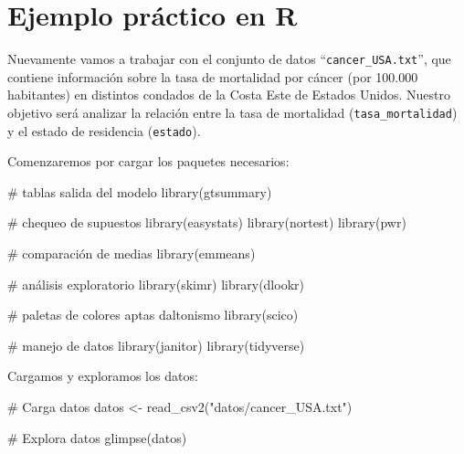 \documentclass[
  spanish,
  a4paper,
]{scrbook}
\newenvironment{Shaded}{\begin{snugshade}}{\end{snugshade}}
\newcommand{\CommentTok}[1]{\textcolor[rgb]{0.37,0.37,0.37}{#1}}
\newcommand{\FunctionTok}[1]{\textcolor[rgb]{0.28,0.35,0.67}{#1}}
\newcommand{\NormalTok}[1]{\textcolor[rgb]{0.00,0.23,0.31}{#1}}
\newcommand{\OtherTok}[1]{\textcolor[rgb]{0.00,0.23,0.31}{#1}}
\newcommand{\StringTok}[1]{\textcolor[rgb]{0.13,0.47,0.30}{#1}}
\begin{document}
\section{Ejemplo práctico en R}\label{ejemplo-pruxe1ctico-en-r-6}

Nuevamente vamos a trabajar con el conjunto de datos
``\texttt{cancer\_USA.txt}'', que contiene información sobre la tasa de
mortalidad por cáncer (por 100.000 habitantes) en distintos condados de
la Costa Este de Estados Unidos. Nuestro objetivo será analizar la
relación entre la tasa de mortalidad (\texttt{tasa\_mortalidad}) y el
estado de residencia (\texttt{estado}).

Comenzaremos por cargar los paquetes necesarios:

\begin{Shaded}
\begin{Highlighting}[]
\CommentTok{\# tablas salida del modelo}
\FunctionTok{library}\NormalTok{(gtsummary)}

\CommentTok{\# chequeo de supuestos}
\FunctionTok{library}\NormalTok{(easystats)}
\FunctionTok{library}\NormalTok{(nortest)}
\FunctionTok{library}\NormalTok{(pwr)}

\CommentTok{\# comparación de medias}
\FunctionTok{library}\NormalTok{(emmeans)}

\CommentTok{\# análisis exploratorio}
\FunctionTok{library}\NormalTok{(skimr)}
\FunctionTok{library}\NormalTok{(dlookr)}

\CommentTok{\# paletas de colores aptas daltonismo}
\FunctionTok{library}\NormalTok{(scico)}

\CommentTok{\# manejo de datos}
\FunctionTok{library}\NormalTok{(janitor)}
\FunctionTok{library}\NormalTok{(tidyverse)}
\end{Highlighting}
\end{Shaded}

Cargamos y exploramos los datos:

\begin{Shaded}
\begin{Highlighting}[]
\CommentTok{\# Carga datos}
\NormalTok{datos }\OtherTok{\textless{}{-}} \FunctionTok{read\_csv2}\NormalTok{(}\StringTok{"datos/cancer\_USA.txt"}\NormalTok{)}

\CommentTok{\# Explora datos}
\FunctionTok{glimpse}\NormalTok{(datos)}
\end{Highlighting}
\end{Shaded}
\end{document}
